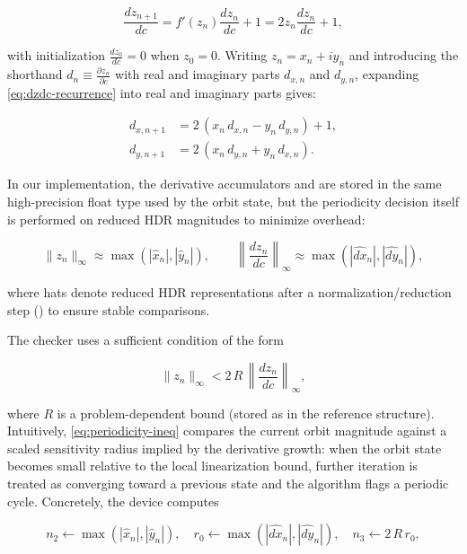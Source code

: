 \begin{equation}
  \frac{d z_{n+1}}{d c} = f'(z_n)\frac{d z_n}{d c} + 1
  = 2 z_n \frac{d z_n}{d c} + 1,
  \label{eq:dzdc-recurrence}
\end{equation}

with initialization \(\frac{dz_0}{dc}=0\) when \(z_0=0\).
Writing \(z_n = x_n + i y_n\) and introducing the shorthand
\(d_n \equiv \frac{\partial z_n}{\partial c}\) with real and imaginary parts
\(d_{x,n}\) and \(d_{y,n}\), expanding
\eqref{eq:dzdc-recurrence} into real and imaginary parts gives:

\begin{align}
  d_{x,n+1} &= 2\,(x_n\, d_{x,n} - y_n\, d_{y,n}) + 1, \label{eq:dzdc-real}\\
  d_{y,n+1} &= 2\,(x_n\, d_{y,n} + y_n\, d_{x,n}). \label{eq:dzdc-imag}
\end{align}

In our implementation, the derivative accumulators  and
 are stored in the same high-precision float type used by the
orbit state, but the periodicity decision itself is performed on reduced HDR
magnitudes to minimize overhead:

\begin{equation}
  \|z_n\|_\infty \approx \max(|\widehat{x}_n|, |\widehat{y}_n|), \qquad
  \left\|\frac{dz_n}{dc}\right\|_\infty \approx \max(|\widehat{d x}_n|, |\widehat{d y}_n|),
\end{equation}

where hats denote reduced HDR representations after a normalization/reduction
step () to ensure stable comparisons.

The checker uses a sufficient condition of the form

\begin{equation}
  \|z_n\|_\infty < 2\,R\,\left\|\frac{dz_n}{dc}\right\|_\infty,
  \label{eq:periodicity-ineq}
\end{equation}

where \(R\) is a problem-dependent bound (stored as  in the
reference structure). Intuitively, \eqref{eq:periodicity-ineq} compares the
current orbit magnitude against a scaled sensitivity radius implied by the
derivative growth: when the orbit state becomes small relative to the local
linearization bound, further iteration is treated as converging toward a
previous state and the algorithm flags a periodic cycle.
Concretely, the device computes

\begin{equation}
  n_2 \leftarrow \max(|\widehat{x}_n|, |\widehat{y}_n|), \quad
  r_0 \leftarrow \max(|\widehat{d x}_n|, |\widehat{d y}_n|), \quad
  n_3 \leftarrow 2\,R\,r_0,
\end{equation}

